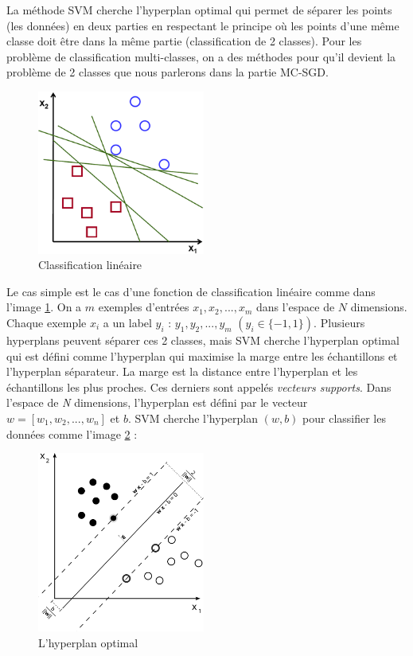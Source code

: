 La méthode SVM cherche l'hyperplan optimal qui permet de séparer les points (les données) en deux parties en respectant le principe où les points d'une même classe doit être dans la même partie (classification de 2 classes). Pour les problème de classification multi-classes, on a des méthodes pour qu'il devient la problème de 2 classes que nous parlerons dans la partie MC-SGD.
\begin{figure}[ht!]
\centering
\includegraphics[width=55mm]{images/separating_lines}
\caption{Classification linéaire}
\label{slines}
\end{figure}

Le cas simple est le cas d'une fonction de classification linéaire comme dans l'image \ref{slines}. On a $m$ exemples d'entrées $x_1, x_2, ..., x_m$ dans l'espace de $N$ dimensions. Chaque exemple $x_i$ a un label $y_i$ : $y_1, y_2, ..., y_m$ $(y_i \in \{-1,1\})$. Plusieurs hyperplans peuvent séparer ces 2 classes, mais SVM cherche l'hyperplan optimal qui est défini comme l'hyperplan qui maximise la marge entre les échantillons et l'hyperplan séparateur. La marge est la distance entre l'hyperplan et les échantillons les plus proches. Ces derniers sont appelés \textit{vecteurs supports}. Dans l'espace de \textit{N} dimensions, l'hyperplan est défini par le vecteur $w=[w_1,w_2,...,w_n]$ et $b$. SVM cherche l'hyperplan $(w, b)$ pour classifier les données comme l'image \ref{max_margin} :

\begin{figure}[ht!]
\centering
\includegraphics[width=55mm]{images/margin}
\caption{L'hyperplan optimal}
\label{max_margin}
\end{figure}

